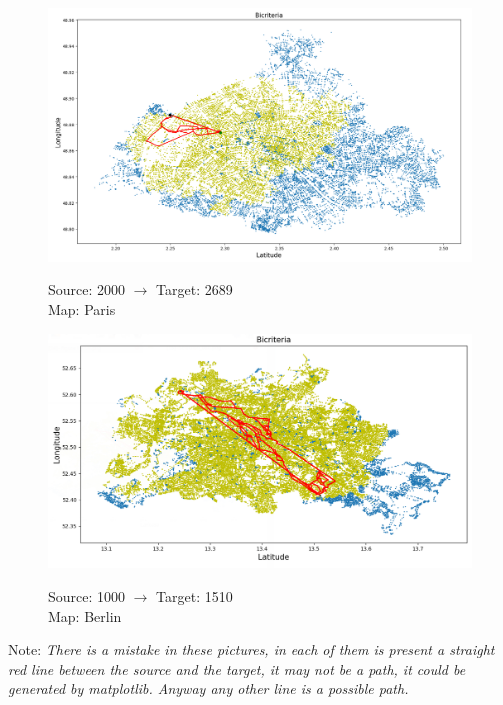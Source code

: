 \documentclass[a4paper,11pt]{report}
\begin{document}
\begin{figure}[H]
	\centering
	\includegraphics[width=\textwidth]{img/mapOutput/2000-2689Bicriteria.png}
	\label{fig:Bicriteria2}
	\hfill
	\begin{center}
		Source: 2000 $\to$ Target: 2689\\Map: Paris
	\end{center}
\end{figure}
\begin{figure}[H]
	\centering
	\includegraphics[width=\textwidth]{img/mapOutput/1000-1510BerlinBicriteria.png}
	\label{fig:Bicriteria3}
	\hfill
	\begin{center}
		Source: 1000 $\to$ Target: 1510\\Map: Berlin
	\end{center}
\end{figure}
\begin{flushleft}
	{\tiny Note: \textit{There is a mistake in these pictures, in each of them is present a straight red line between the source and the target, it may not be a path, it could be generated by matplotlib. Anyway any other line is a possible path.}}
\end{flushleft}
\end{document}
